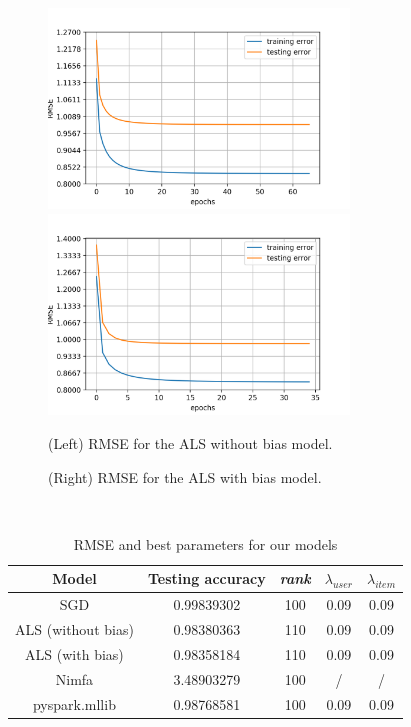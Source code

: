 \documentclass[a4paper]{article}
\begin{document}
\begin{figure}[h]
  \centering
  \includegraphics[width=8cm]{RMSE_ALS.png}
  \includegraphics[width=8cm]{RMSE_ALS_BIAS.png}
  \label{fig:figure 3}
  \caption{(Left) RMSE for the ALS without bias model.}
  \label{fig:figure 4}
  \caption{(Right) RMSE for the ALS with bias model.}
\end{figure}

\mbox{}\\

\begin{table}[h!]
  \centering
  \begin{tabular}{|c|c|c|c|c|}
    \hline
    \textbf{Model} & \textbf{Testing accuracy} & \textbf{\textit{rank}} & \boldmath\(\lambda_{user}\)& \boldmath\(\lambda_{item}\)\\
    \hline
    SGD & 0.99839302 & 100 & 0.09 & 0.09\\
    \hline
    ALS (without bias) & 0.98380363 & 110 & 0.09 & 0.09\\
    \hline
    ALS (with bias) & 0.98358184 & 110 & 0.09 & 0.09\\
    \hline
    Nimfa & 3.48903279 & 100 & / & / \\
    \hline
    pyspark.mllib & 0.98768581 & 100 & 0.09 & 0.09\\
    \hline
  \end{tabular}
  \caption{RMSE and best parameters for our models}
  \label{tab:table 1}
\end{table}
\mbox{}\\
\end{document}
